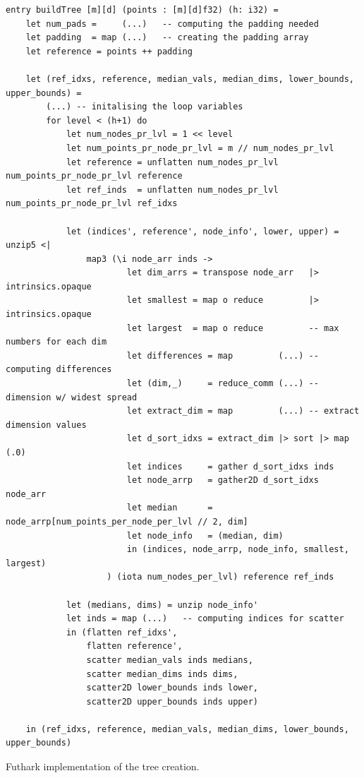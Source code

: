\begin{listing}[H]
\begin{verbatim}
entry buildTree [m][d] (points : [m][d]f32) (h: i32) =
    let num_pads =     (...)   -- computing the padding needed
    let padding  = map (...)   -- creating the padding array
    let reference = points ++ padding

    let (ref_idxs, reference, median_vals, median_dims, lower_bounds, upper_bounds) =
    	(...) -- initalising the loop variables
        for level < (h+1) do
            let num_nodes_pr_lvl = 1 << level
            let num_points_pr_node_pr_lvl = m // num_nodes_pr_lvl
            let reference = unflatten num_nodes_pr_lvl num_points_pr_node_pr_lvl reference
            let ref_inds  = unflatten num_nodes_pr_lvl num_points_pr_node_pr_lvl ref_idxs

            let (indices', reference', node_info', lower, upper) = unzip5 <|
                map3 (\i node_arr inds ->
                        let dim_arrs = transpose node_arr   |> intrinsics.opaque
                        let smallest = map o reduce         |> intrinsics.opaque
                        let largest  = map o reduce         -- max numbers for each dim
                        let differences = map         (...) -- computing differences
                        let (dim,_)     = reduce_comm (...) -- dimension w/ widest spread
                        let extract_dim = map         (...) -- extract dimension values
                        let d_sort_idxs = extract_dim |> sort |> map (.0)
                        let indices     = gather d_sort_idxs inds
                        let node_arrp   = gather2D d_sort_idxs node_arr
                        let median      = node_arrp[num_points_per_node_per_lvl // 2, dim]
                        let node_info   = (median, dim)
                        in (indices, node_arrp, node_info, smallest, largest)
                    ) (iota num_nodes_per_lvl) reference ref_inds

            let (medians, dims) = unzip node_info'
            let inds = map (...)   -- computing indices for scatter
            in (flatten ref_idxs', 
                flatten reference', 
                scatter median_vals inds medians,
                scatter median_dims inds dims, 
                scatter2D lower_bounds inds lower,
                scatter2D upper_bounds inds upper)

    in (ref_idxs, reference, median_vals, median_dims, lower_bounds, upper_bounds)
\end{verbatim}
\caption{Futhark implementation of the tree creation.}
\label{lst:tree}
\end{listing}

